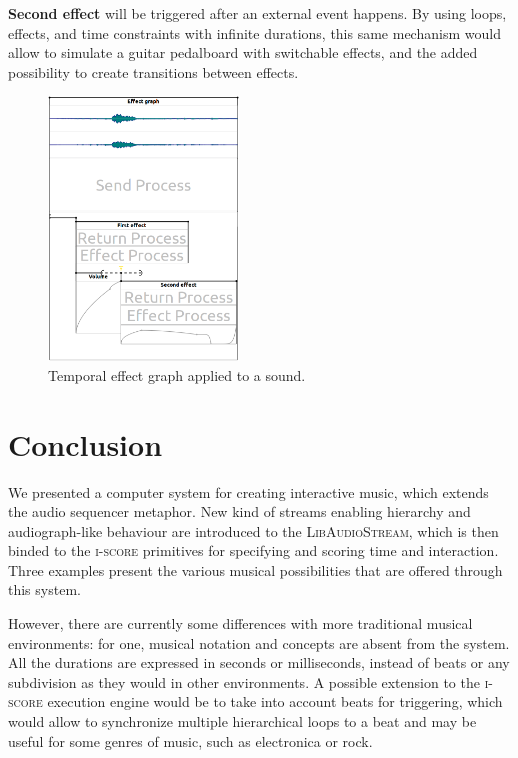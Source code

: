 \documentclass{article}
\newcommand*{\LibAudioStream}{\textsc{LibAudioStream}\xspace}
\newcommand*{\iscore}{\textsc{i-score}\xspace}
\begin{document}
\textbf{Second effect} will be triggered after an external event happens.
By using loops, effects, and time constraints with infinite durations, this same mechanism would allow to simulate a guitar pedalboard with switchable effects, and the added possibility to create transitions between effects.

\begin{figure}[h]
    \centering
    \includegraphics[width=0.45\textwidth]{figures/ex3.png}
    \caption{Temporal effect graph applied to a sound.}
    \label{fig.score3}
\end{figure}

\section{Conclusion}
We presented a computer system for creating interactive music, which extends the audio sequencer metaphor.
New kind of streams enabling hierarchy and audiograph-like behaviour are introduced to the \LibAudioStream, which is then binded to the \iscore primitives for specifying and scoring time and interaction.
Three examples present the various musical possibilities that are offered
through this system.

However, there are currently some differences with more traditional musical environments: for one, musical notation and concepts are absent from the system.
All the durations are expressed in seconds or milliseconds, instead of beats or any subdivision as they would in other environments. 
A possible extension to the \iscore execution engine would be to take into account beats for triggering, which would allow to synchronize multiple hierarchical loops to a beat and may be useful for some genres of music, such as electronica or rock.
\end{document}

